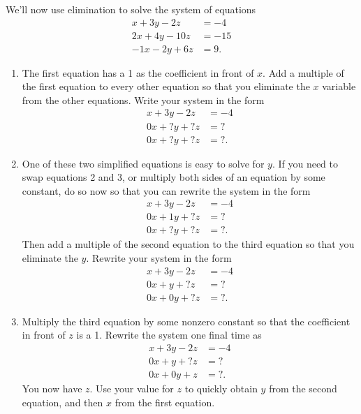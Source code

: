 \begin{problem}
We'll now use elimination to solve the system of equations 
\begin{align*}
x+3y-2z&=-4 \\
2x+4y-10z&=-15 \\
-1x-2y+6z&=9. 
\end{align*}
\begin{enumerate}
 \item 
{}%
The first equation has a 1 as the coefficient in front of $x$. Add a multiple of the first equation to every other equation so that you eliminate the $x$ variable from the other equations.
Write your system in the form 
\begin{align*}
x+3y-2z&=-4 \\
0x+?y+?z&=? \\
0x+?y+?z&=?. 
\end{align*}
 \item One of these two simplified equations is easy to solve for $y$. If you need to swap equations 2 and 3, or multiply both sides of an equation by some constant, do so now so that you can rewrite the system in the form 
%
\begin{align*}
x+3y-2z&=-4 \\
0x+1y+?z&=? \\
0x+?y+?z&=?. 
\end{align*}
Then add a multiple of the second equation to the third equation so that you eliminate the $y$. 
Rewrite your system in the form 
\begin{align*}
x+3y-2z&=-4 \\
0x+y+?z&=? \\
0x+0y+?z&=?. 
\end{align*}
\item 
{}%
Multiply the third equation by some nonzero constant so that the coefficient in front of $z$ is a 1. Rewrite the system one final time as
\begin{align*}
x+3y-2z&=-4 \\
0x+y+?z&=? \\
0x+0y+z&=?. 
\end{align*}
 You now have $z$. Use your value for $z$ to quickly obtain $y$ from the second equation, and then $x$ from the first equation.
\end{enumerate}
\end{problem}
